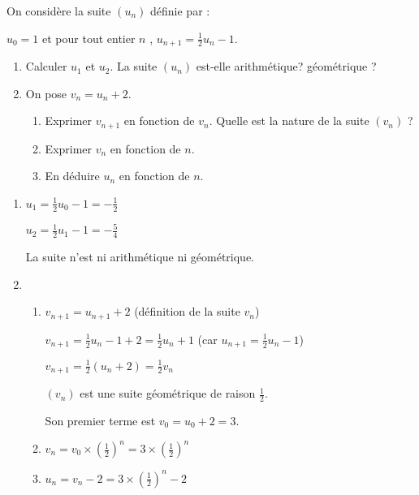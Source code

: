 
%
On considère la suite $\left(u_{n}\right)$ définie par :
\par
$u_{0}=1$ et pour tout entier $n$ , $u_{n+1}= \frac{1}{2} u_{n}-1$.
\begin{enumerate}
     \item
     Calculer $u_{1}$ et $u_{2}$. La suite $\left(u_{n}\right)$ est-elle arithmétique? géométrique ?
     \item
     On pose $v_{n}=u_{n}+2$.
     \begin{enumerate}[label=\alph*.]
          \item
          Exprimer $v_{n+1}$ en fonction de $v_{n}$. Quelle est la nature de la suite $\left(v_{n}\right)$ ?
          \item
          Exprimer $v_{n}$ en fonction de $n$.
          \item
          En déduire $u_{n}$ en fonction de $n$.
     \end{enumerate}
\end{enumerate}
\begin{corrige}
     \begin{enumerate}
          \item
          $u_{1}=\frac{1}{2}u_{0}-1=-\frac{1}{2}$
          \par
          $u_{2}=\frac{1}{2}u_{1}-1=-\frac{5}{4}$
          \par
          La suite n'est ni arithmétique ni géométrique.
   
     \item 
\begin{enumerate}[label=\alph*.]
          \item
          $v_{n+1}=u_{n+1}+2  $  (définition de la suite $v_{n}$)
          \par
          $v_{n+1}=\frac{1}{2}u_{n}-1+2=\frac{1}{2}u_{n}+1   $ (car $u_{n+1}= \frac{1}{2} u_{n}-1$)
          \par
          $v_{n+1}=\frac{1}{2}\left(u_{n}+2\right)=\frac{1}{2}v_{n}$
          \par
          $\left(v_{n}\right)$ est une suite géométrique de raison $\frac{1}{2}$.
          \par
          Son premier terme est $v_{0}=u_{0}+2=3$.
          \item
          $v_{n}=v_{0}\times \left(\frac{1}{2}\right)^{n}=3\times \left(\frac{1}{2}\right)^{n}$
          \item
          $u_{n}=v_{n}-2=3\times \left(\frac{1}{2}\right)^{n}-2$
     \end{enumerate}
\end{enumerate}
\end{corrige}
